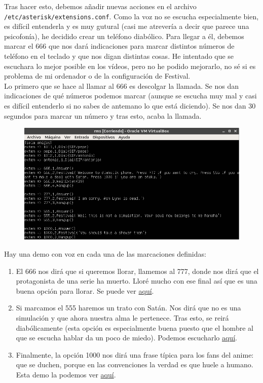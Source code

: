 \documentclass[11pt,a4paper]{article}
\begin{document}
Tras hacer esto, debemos añadir nuevas acciones en el archivo \texttt{/etc/asterisk/extensions.conf}. Como la voz no se escucha especialmente bien, es difícil entenderla y es muy gutural (casi me atrevería a decir que parece una psicofonía), he decidido crear un teléfono diabólico. Para llegar a él, debemos marcar el 666 que nos dará indicaciones para marcar distintos números de teléfono en el teclado y que nos digan distintas cosas. He intentado que se escuchara lo mejor posible en los vídeos, pero no he podido mejorarlo, no sé si es problema de mi ordenador o de la configuración de Festival.\\

Lo primero que se hace al llamar al 666 es descolgar la llamada. Se nos dan indicaciones de qué números podemos marcar (aunque se escucha muy mal y casi es difícil entenderlo si no sabes de antemano lo que está diciendo). Se nos dan 30 segundos para marcar un número y tras esto, acaba la llamada.

\begin{figure}[H]
	\centering
	\includegraphics[scale=0.5]{img/16.png}
\end{figure}

Hay una demo con voz en cada una de las marcaciones definidas:

\begin{enumerate}
	\item El 666 nos dirá que si queremos llorar, llamemos al 777, donde nos dirá que el protagonista de una serie ha muerto. Lloré mucho con ese final así que es una buena opción para llorar. Se puede ver \color{blue}\href{https://drive.google.com/open?id=1w3ODj_3aljfEZ5kZcgPZMaOg2Cl3rgpr}{aquí}. \color{black}
	\item Si marcamos el 555 haremos un trato con Satán. Nos dirá que no es una simulación y que ahora nuestra alma le pertenece. Tras esto, se reirá diabólicamente (esta opción es especialmente buena puesto que el hombre al que se escucha hablar da un poco de miedo). Podemos escucharlo \color{blue}\href{https://drive.google.com/open?id=11bMZqrCEVJr9x30LQ493zslP8FdOq8Ds}{aquí}. \color{black}
	\item Finalmente, la opción 1000 nos dirá una frase típica para los fans del anime: que se duchen, porque en las convenciones la verdad es que huele a humano. Esta demo la podemos ver \color{blue}\href{https://drive.google.com/open?id=1uzIh4hmp6K5s--y0RzpPWzXudsFpidG_}{aquí}. \color{black}
\end{enumerate}
\end{document}
